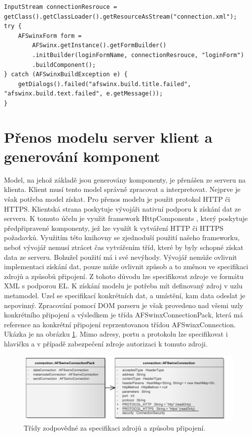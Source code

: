 \begin{lstlisting}[caption={Generování formuláře na klientovi},
label={code:formGeneration}, basicstyle=\footnotesize]
InputStream connectionResrouce = getClass().getClassLoader().getResourceAsStream("connection.xml");
try {
	AFSwinxForm form =
		AFSwinx.getInstance().getFormBuilder()
		.initBuilder(loginFormName, connectionResrouce, "loginForm")
		.buildComponent();
} catch (AFSwinxBuildException e) {
	getDialogs().failed("afswinx.build.title.failed", "afswinx.build.text.failed", e.getMessage());
}
\end{lstlisting}

\section{Přenos modelu server klient a generování komponent}
Model, na jehož základě jsou generovány komponenty, je přenášen ze serveru na klienta. Klient musí tento model správně zpracovat a interpretovat. Nejprve je však potřeba model získat. Pro přenos modelu je použit protokol HTTP či HTTPS. Klientská strana poskytuje vývojáři nativní podporu k získání dat ze serveru. K tomuto účelu je využit framework HttpComponents \cite{apacheHttp}, který poskytuje předpřipravené komponenty, jež lze využít k vytváření HTTP či HTTPS požadavků. Využitím této knihovny se zjednoduší použití našeho frameworku, neboť vývojář nemusí ztrácet čas vytvářením tříd, které by byly schopné získat data ze serveru. Bohužel použití má i své nevýhody. Vývojář nemůže ovlivnit implementaci získání dat, pouze může ovlivnit způsob a to změnou ve specifikaci zdrojů a způsobů připojení. Z tohoto důvodu lze specifikovat zdroje ve formátu XML s podporou EL. K získání modelu je potřeba mít definovaný zdroj v uzlu metamodel. Uzel se specifikací konkrétních dat, a umístění, kam data odeslat je nepovinný. Zpracování pomocí DOM parseru je však provedeno nad všemi uzly konkrétního připojení a výsledkem je třída AFSwinxConnectionPack, která má reference na konkrétní připojení reprzentovanou třídou AFSwinxConnection. Ukázka je na obrázku \ref{img:connectionPack}. Mimo adresy, portu a protokolu lze specifikovat i hlavičku a v případě zabezpečení zdroje autorizaci k tomuto zdroji.

\begin{figure}[h!]
\includegraphics{images/connectionPack}
\caption{Třídy zodpovědné za specifikaci zdrojů a způsobu připojení.}
\label{img:connectionPack}
\end{figure}

